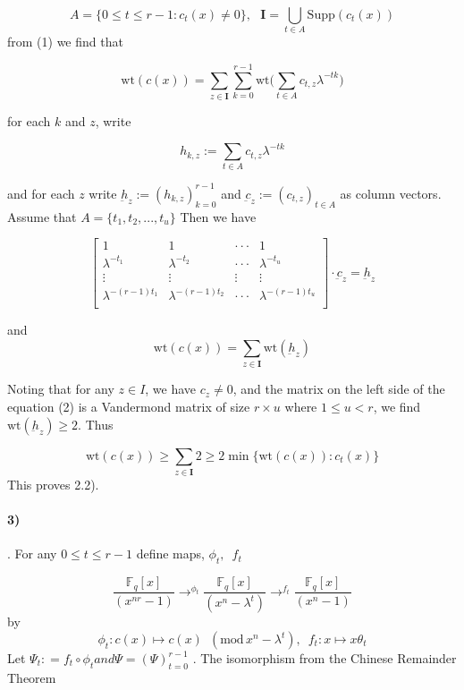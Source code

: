 \documentclass[fontsize=12pt]{article}
\begin{document}
$$ A = \{ 0\leq t \leq r-1 : c_t(x) \neq 0 \}, \,\,\,\, \mathbf{I} = \bigcup_{t \in A} \text{Supp}(c_t(x)) $$
 from (1) we find that 
 
 $$  \text{wt}(c(x)) = \sum_{z\in \mathbf{I}}^{} \sum_{k=0}^{r-1} \text{wt} \Big (\sum_{t\in A}^{} c_{t,z}\lambda^{-tk}  \Big)  $$
 
 for each $k$ and $z$, write
 
 $$  h_{k,z} := \sum_{t \in A} c_{t,z}\lambda^{-tk}  $$
 
 and for each $z$ write 
 $ \underbar{h}_z := (h_{k,z})_{k=0}^{r-1}$ and $\underbar{c}_z:= (c_{t,z})_{t\in A}$
as column vectors. Assume that $A = \{ t_1,t_2,...,t_u \}$ Then we have

\begin{equation}
\begin{bmatrix} 
  1     & 1 &\cdot \cdot \cdot &1 \\ 
  \lambda^{-t_1}     &  \lambda^{-t_2} &\cdot \cdot \cdot & \lambda^{-t_u} \\
   \vdots & \vdots &\vdots &\vdots \\
  \lambda^{-(r-1)t_1}     &  \lambda^{-(r-1)t_2} &\cdot \cdot \cdot & \lambda^{-(r-1)t_u} \\
\end{bmatrix}
\cdot \underbar{c}_z = \underbar{h}_z
\end{equation}

and $$\text{wt}(c(x)) = \sum_{z \in \mathbf{I}} \text{wt}(\underbar{h}_z)$$

Noting that for any $z\in I$, we have $c_z \neq 0$, and the matrix
on the left side of the equation (2) is a Vandermond matrix
of size $r \times u $ where $1 \leq u < r$, we find $\text{wt}(\underbar{h}_z) \geq 2$. Thus

$$ \text{wt}(c(x)) \geq \sum_{z \in \mathbf{I}} 2 \geq 2 \min\{\text{wt}(c(x)) : c_t(x)  \}  $$
This proves 2.2).

\paragraph{3)}. For any $0 \leq t \leq r-1$ define maps, $\phi_t, \,\,\, f_t$

$$  \frac{\mathbb{F}_q[x]}{(x^{nr} - 1)} \rightarrow^{\phi_t } \frac{\mathbb{F}_q[x]}{(x^{n} - \lambda^t)} \rightarrow^{f_t } \frac{\mathbb{F}_q[x]}{(x^{n} - 1)}$$
by 
$$ \phi_t : c(x) \mapsto c(x) \,\,\,(\text{mod} \,x^n-\lambda^t), \,\,\, f_t : x \mapsto x \theta_t$$
Let $\Psi_t : = f_t \circ \phi_t and \Psi = (\Psi)_{t=0}^{r-1}$ . The isomorphism from the Chinese Remainder Theorem
\end{document}
